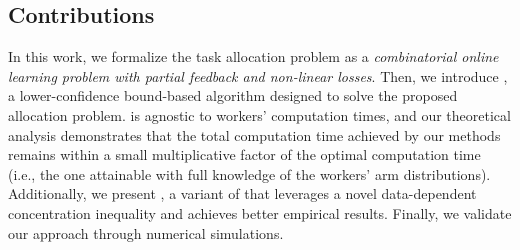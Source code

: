 \subsection{Contributions}

In this work, we formalize the task allocation problem as a \emph{combinatorial online learning problem with partial feedback and non-linear losses}. Then, we introduce , a lower-confidence bound-based algorithm designed to solve the proposed allocation problem.  is agnostic to workers' computation times, and our theoretical analysis demonstrates that the total computation time achieved by our methods remains within a small multiplicative factor of the optimal computation time (i.e., the one attainable with full knowledge of the workers' arm distributions).
Additionally, we present , a variant of  that leverages a novel data-dependent concentration inequality and achieves better empirical results.
Finally, we validate our approach through numerical simulations.




